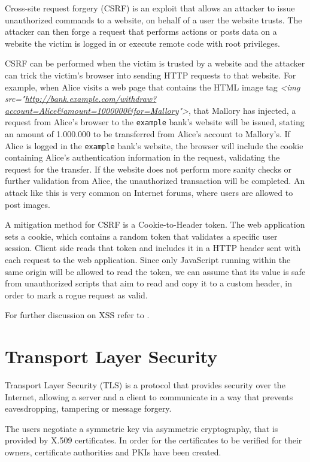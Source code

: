 Cross-site request forgery (CSRF) is an exploit that allows an attacker to issue
unauthorized commands to a website, on behalf of a user the website trusts. The
attacker can then forge a request that performs actions or posts data on a
website the victim is logged in or execute remote code with root privileges.

CSRF can be performed when the victim is trusted by a website and the attacker
can trick the victim's browser into sending HTTP requests to that website. For
example, when Alice visits a web page that contains the HTML image tag
\textit{<img
src="\url{http://bank.example.com/withdraw?account=Alice&amount=1000000&for=Mallory}">},
that Mallory has injected, a request from Alice's browser to the
\texttt{example} bank's website will be issued, stating an amount of
1.000.000 to be transferred from Alice's account to Mallory's. If Alice is
logged in the \texttt{example} bank's website, the browser will include the
cookie containing Alice's authentication information in the request, validating
the request for the transfer. If the website does not perform more sanity checks
or further validation from Alice, the unauthorized transaction will be
completed. An attack like this is very common on Internet forums, where users
are allowed to post images.

A mitigation method for CSRF is a Cookie-to-Header token. The web application
sets a cookie, which contains a random token that validates a specific user
session. Client side reads that token and includes it in a HTTP header sent with
each request to the web application. Since only JavaScript running within the
same origin will be allowed to read the token, we can assume that its value is
safe from unauthorized scripts that aim to read and copy it to a custom header,
in order to mark a rogue request as valid.

For further discussion on XSS refer to \cite{csrfowasp}.

\section{Transport Layer Security}\label{sec:tls}

Transport Layer Security (TLS) is a protocol that provides security over the
Internet, allowing a server and a client to communicate in a way that prevents
eavesdropping, tampering or message forgery.

The users negotiate a symmetric key via asymmetric cryptography, that is
provided by X.509 certificates. In order for the certificates to be verified for
their owners, certificate authorities and PKIs have been created.

